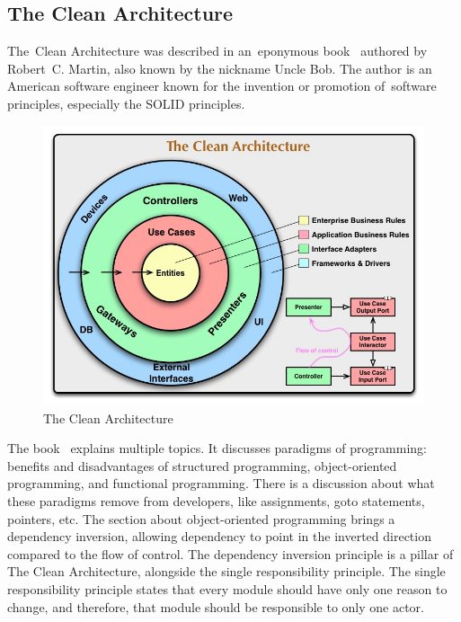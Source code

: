 \subsection{The Clean Architecture}
\label{design:architecture:clean-archiecture}

The~Clean Architecture was described in an~eponymous book~\cite{martin_2018_clean_architecture} authored by Robert~C. Martin, also known by the nickname Uncle Bob.
The author is an American software engineer known for the invention or promotion of~software principles, especially the SOLID principles.

\begin{figure}
    \centering
    \includegraphics[width=1\linewidth]{assets/design/cleanarchitecture.jpg}
    \caption{The Clean Architecture}
    \label{fig:thecleanarchitecture}
\end{figure}

The book~\cite{martin_2018_clean_architecture} explains multiple topics.
It discusses paradigms of programming: benefits and disadvantages of structured programming, object-oriented programming, and functional programming.
There is a discussion about what these paradigms remove from developers, like assignments, goto statements, pointers, etc.
The section about object-oriented programming brings a dependency inversion, allowing dependency to point in the inverted direction compared to the flow of control.
The dependency inversion principle is a pillar of The Clean Architecture, alongside the single responsibility principle.
The single responsibility principle states that every module should have only one reason to change, and therefore, that module should be responsible to only one actor.

